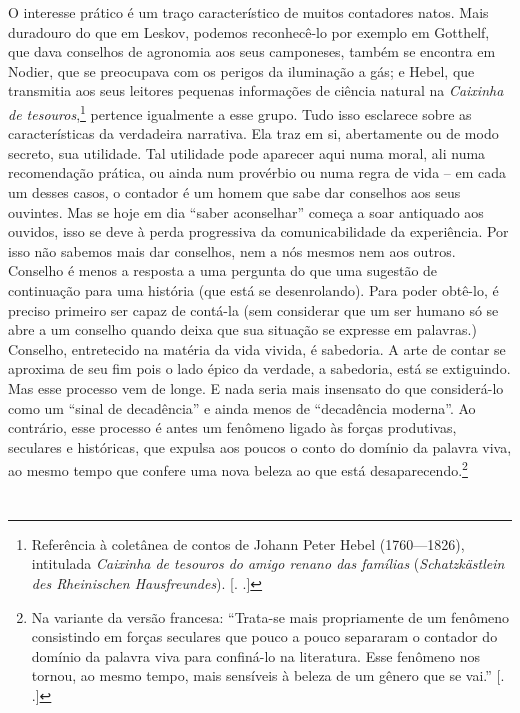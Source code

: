O interesse prático é um traço característico de muitos contadores
natos. Mais duradouro do que em Leskov, podemos reconhecê-lo por exemplo
em Gotthelf, que dava conselhos de agronomia aos seus camponeses, também
se encontra em Nodier, que se preocupava com os perigos da iluminação a
gás; e Hebel, que transmitia aos seus leitores pequenas informações de
ciência natural na \emph{Caixinha de tesouros},\footnote{Referência à
  coletânea de contos de Johann Peter Hebel (1760---1826), intitulada
  \emph{Caixinha de tesouros do amigo renano das famílias}
  (\emph{Schatzkästlein des Rheinischen Hausfreundes}). [. .]}
pertence igualmente a esse grupo. Tudo isso esclarece sobre as
características da verdadeira narrativa. Ela traz em si, abertamente ou
de modo secreto, sua utilidade. Tal utilidade pode aparecer aqui numa
moral, ali numa recomendação prática, ou ainda num provérbio ou numa
regra de vida -- em cada um desses casos, o contador é um homem que sabe
dar conselhos aos seus ouvintes. Mas se hoje em dia ``saber aconselhar''
começa a soar antiquado aos ouvidos, isso se deve à perda progressiva da
comunicabilidade da experiência. Por isso não sabemos mais dar
conselhos, nem a nós mesmos nem aos outros. Conselho é menos a resposta
a uma pergunta do que uma sugestão de continuação para uma história (que
está se desenrolando). Para poder obtê-lo, é preciso primeiro ser capaz
de contá-la (sem considerar que um ser humano só se abre a um conselho
quando deixa que sua situação se expresse em palavras.) Conselho,
entretecido na matéria da vida vivida, é sabedoria. A arte de contar se
aproxima de seu fim pois o lado épico da verdade\label{supra2}, a sabedoria, está se
extiguindo. Mas esse processo vem de longe. E nada seria mais insensato
do que considerá-lo como um ``sinal de decadência'' e ainda menos de
``decadência moderna''. Ao contrário, esse processo é antes um fenômeno
ligado às forças produtivas, seculares e históricas, que expulsa aos
poucos o conto do domínio da palavra viva, ao mesmo tempo que confere
uma nova beleza ao que está desaparecendo.\footnote{Na variante da
  versão francesa: ``Trata-se mais propriamente de um fenômeno
  consistindo em forças seculares que pouco a pouco separaram o contador
  do domínio da palavra viva para confiná-lo na literatura. Esse
  fenômeno nos tornou, ao mesmo tempo, mais sensíveis à beleza de um
  gênero que se vai.'' [. .]}

\section{}

